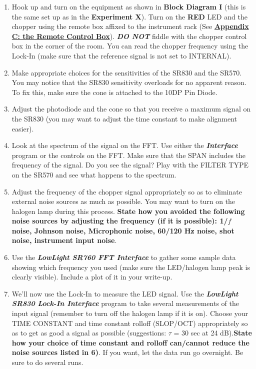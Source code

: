 \documentclass{../lab}
\begin{document}
\begin{enumerate}
    \item Hook up and turn on the equipment as shown in \textbf{Block Diagram I} (this is the same set up as in the \textbf{Experiment X}). Turn on the \textbf{RED} LED and the chopper using the remote box affixed to the instrument rack (See \href{http://experimentationlab.berkeley.edu/node/98}{\textbf{Appendix C: the Remote Control Box}}). \emph{\textbf{DO NOT}} fiddle with the chopper control box in the corner of the room. You can read the chopper frequency using the Lock-In (make sure that the reference signal is not set to INTERNAL).

    \item Make appropriate choices for the sensitivities of the SR830 and the SR570. You may notice that the SR830 sensitivity overloads for no apparent reason. To fix this, make sure the cone is attached to the 10DP Pin Diode.

    \item Adjust the photodiode and the cone so that you receive a maximum signal on the SR830 (you may want to adjust the time constant to make alignment easier).

    \item Look at the spectrum of the signal on the FFT. Use either the \emph{\textbf{Interface}} program or the controls on the FFT. Make sure that the SPAN includes the frequency of the signal. Do you see the signal? Play with the FILTER TYPE on the SR570 and see what happens to the spectrum.

    \item Adjust the frequency of the chopper signal appropriately so as to eliminate external noise sources as much as possible. You may want to turn on the halogen lamp during this process. \textbf{State how you avoided the following noise sources by adjusting the frequency (if it is possible): 1/$f$ noise, Johnson noise, Microphonic noise, 60/120 Hz noise, shot noise, instrument input noise}.

    \item Use the \emph{\textbf{LowLight SR760 FFT Interface}} to gather some sample data showing which frequency you used (make sure the LED/halogen lamp peak is clearly visible). Include a plot of it in your write-up.

    \item We'll now use the Lock-In to measure the LED signal. Use the \emph{\textbf{LowLight SR830 Lock-In Interface}} program to take several measurements of the input signal (remember to turn off the halogen lamp if it is on). Choose your TIME CONSTANT and time constant rolloff (SLOP/OCT) appropriately so as to get as good a signal as possible (suggestions: $\tau$ = 30 sec at 24 dB).\textbf{State how your choice of time constant and rolloff can/cannot reduce the noise sources listed in 6)}. If you want, let the data run go overnight. Be sure to do several runs.


\end{enumerate}
\end{document}
